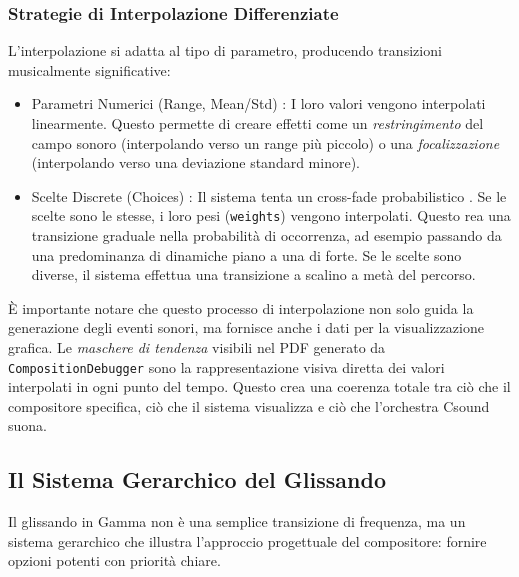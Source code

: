 \subsubsection{Strategie di Interpolazione Differenziate}
L'interpolazione si adatta al tipo di parametro, producendo transizioni musicalmente significative:

\begin{itemize}
 \item Parametri Numerici (Range, Mean/Std) : I loro valori vengono interpolati linearmente. Questo permette di creare effetti come un \textit{restringimento} del campo sonoro (interpolando verso un range più piccolo) o una \textit{focalizzazione} (interpolando verso una deviazione standard minore).
\end{itemize}

\begin{itemize}
 \item Scelte Discrete (Choices) : Il sistema tenta un  cross-fade probabilistico . Se le scelte sono le stesse, i loro pesi (\texttt{weights}) vengono interpolati. Questo rea una transizione graduale nella probabilità di occorrenza, ad esempio passando da una predominanza di dinamiche piano a una di forte. Se le scelte sono diverse, il sistema effettua una transizione a scalino a metà del percorso.
\end{itemize}

È importante notare che questo processo di interpolazione non solo guida la generazione degli eventi sonori, ma fornisce anche i dati per la visualizzazione grafica. Le \textit{maschere di tendenza} visibili nel PDF generato da \texttt{CompositionDebugger} sono la rappresentazione visiva diretta dei valori interpolati in ogni punto del tempo. Questo crea una coerenza totale tra ciò che il compositore specifica, ciò che il sistema visualizza e ciò che l'orchestra Csound suona.
\subsection{Il Sistema Gerarchico del Glissando}
Il glissando in Gamma non è una semplice transizione di frequenza, ma un sistema gerarchico che illustra l'approccio progettuale del compositore: fornire opzioni potenti con priorità chiare.

